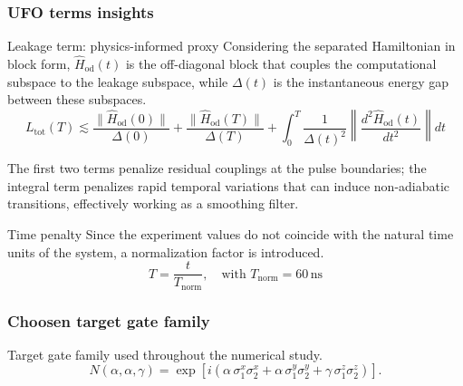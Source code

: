 \documentclass{beamer}
\begin{document}
\begin{frame}
    \frametitle{UFO terms insights}
    \begin{block}{Leakage term: physics-informed proxy}
        \scriptsize
        Considering the separated Hamiltonian in block form, \(\hat{H}_{\mathrm{od}}(t)\) is the off-diagonal block that couples the computational subspace to the leakage subspace, while \(\Delta(t)\) is the instantaneous energy gap between these subspaces. 
        \[
            L_{\mathrm{tot}}(T)\lesssim
            \frac{\|\hat{H}_{\mathrm{od}}(0)\|}{\Delta(0)}
            +
            \frac{\|\hat{H}_{\mathrm{od}}(T)\|}{\Delta(T)}
            +
            \int_{0}^{T}
\frac{1}{\Delta(t)^2}
\left\|
\frac{d^2 \hat{H}_{\mathrm{od}}(t)}{dt^2}
\right\|dt
\]
\scriptsize


The first two terms penalize residual couplings at the pulse boundaries; the integral term penalizes rapid temporal variations that can induce non-adiabatic transitions, effectively working as a smoothing filter.

\end{block}
\begin{block}{Time penalty}
    \scriptsize
    Since the experiment values do not coincide with the natural time units of the system, a normalization factor is introduced.
    \[
    T = \frac{t}{T_{\mathrm{norm}}}, \quad \text{with } T_{\mathrm{norm}}=60\,\mathrm{ns}
    \]
\end{block}
\let\thefootnote\relax{}
\end{frame}

\begin{frame}
    \frametitle{Choosen target gate family}
\begin{block}{Target gate family used throughout the numerical study.} 
\[
N(\alpha,\alpha,\gamma)=
\exp\!\left[
i\left(
\alpha\,\sigma_1^x\sigma_2^x+
\alpha\,\sigma_1^y\sigma_2^y+
\gamma\,\sigma_1^z\sigma_2^z
\right)
\right].
\]
\end{block}
\let\thefootnote\relax{}
\end{frame}
\end{document}
